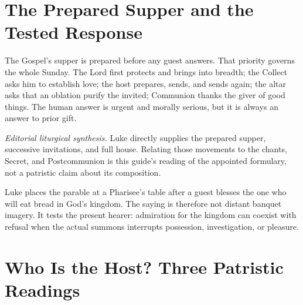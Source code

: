 \newpage
\begin{deepstudy}

\section*{The Prepared Supper and the Tested Response}

The Gospel's supper is prepared before any guest answers. That priority governs the whole Sunday. The Lord first protects and brings into breadth; the Collect asks him to establish love; the host prepares, sends, and sends again; the altar asks that an oblation purify the invited; Communion thanks the giver of good things. The human answer is urgent and morally serious, but it is always an answer to prior gift.

\begin{center}
\end{center}

\noindent\emph{Editorial liturgical synthesis.} Luke directly supplies the prepared supper, successive invitations, and full house. Relating those movements to the chants, Secret, and Postcommunion is this guide's reading of the appointed formulary, not a patristic claim about its composition.

Luke places the parable at a Pharisee's table after a guest blesses the one who will eat bread in God's kingdom. The saying is therefore not distant banquet imagery. It tests the present hearer: admiration for the kingdom can coexist with refusal when the actual summons interrupts possession, investigation, or pleasure.

\sectionguard
\section*{Who Is the Host? Three Patristic Readings}


\end{deepstudy}
